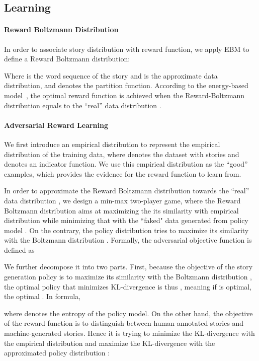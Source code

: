 \documentclass[11pt,a4paper]{article}
\begin{document}
\subsection{Learning}
\label{sec:learn}
\paragraph{Reward Boltzmann Distribution}
In order to associate story distribution with reward function, we apply EBM to define a Reward Boltzmann distribution:

Where  is the word sequence of the story and  is the approximate data distribution, and  denotes the partition function. According to the energy-based model~\cite{lecun2006tutorial}, the optimal reward function  is achieved when the Reward-Boltzmann distribution equals to the ``real'' data distribution . 

\paragraph{Adversarial Reward Learning}
We first introduce an empirical distribution  to represent the empirical distribution of the training data, where  denotes the dataset with  stories and  denotes an indicator function. We use this empirical distribution as the ``good'' examples, which provides the evidence for the reward function to learn from. 

In order to approximate the Reward Boltzmann distribution towards the ``real'' data distribution , we design a min-max two-player game, where the Reward Boltzmann distribution  aims at maximizing the its similarity with empirical distribution  while minimizing that with the ``faked" data generated from policy model . On the contrary, the policy distribution  tries to maximize its similarity with the Boltzmann distribution . Formally, the adversarial objective function is defined as
\vspace*{-1ex}

We further decompose it into two parts. First, because the objective  of the story generation policy is to maximize its similarity with the Boltzmann distribution , the optimal policy that minimizes KL-divergence is thus , meaning if  is optimal, the optimal . In formula, 

where  denotes the entropy of the policy model. On the other hand, the objective  of the reward function is to distinguish between human-annotated stories and machine-generated stories. Hence it is trying to minimize the KL-divergence with the empirical distribution  and maximize the KL-divergence with the approximated policy distribution :
\end{document}

